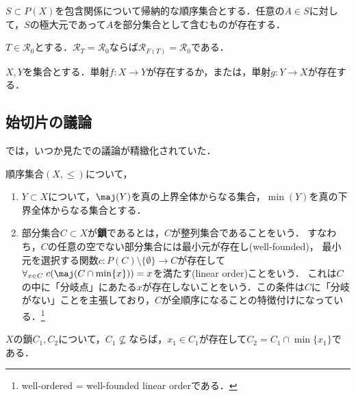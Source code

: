 \documentclass[uplatex,dvipdfmx]{jsreport}
\begin{document}
\begin{theorem}[Zorn, AC (1935)]
    $S\subset P(X)$を包含関係について帰納的な順序集合とする．任意の$A\in S$に対して，$S$の極大元であって$A$を部分集合として含むものが存在する．
\end{theorem}

\begin{lemma}
    $T\in\mathcal{R}_0$とする．$\mathcal{R}_T=\mathcal{R}_0$ならば$\mathcal{R}_{F(T)}=\mathcal{R}_0$である．
\end{lemma}

\begin{proposition}[Setの全順序性 AC]
    $X,Y$を集合とする．単射$f:X\to Y$が存在するか，または，単射$g:Y\to X$が存在する．
\end{proposition}

\subsection{始切片の議論}

\begin{tcolorbox}[colframe=ForestGreen, colback=ForestGreen!10!white,breakable,colbacktitle=ForestGreen!40!white,coltitle=black,fonttitle=\bfseries\sffamily,
title=]
    \cite{Analysis Now}では，いつか見た\cite{松坂和夫}での議論が精緻化されていた．
\end{tcolorbox}

\begin{definition}[chain]
    順序集合$(X,\le)$について，
    \begin{enumerate}
        \item $Y\subset X$について，$\maj(Y)$を真の上界全体からなる集合，$\min(Y)$を真の下界全体からなる集合とする．
        \item 部分集合$C\subset X$が\textbf{鎖}であるとは，$C$が整列集合であることをいう．
        すなわち，$C$の任意の空でない部分集合には最小元が存在し(well-founded)，
        最小元を選択する関数$c:P(C)\setminus\{\emptyset\}\to C$が存在して$\forall_{x\in C}\;c(\maj(C\cap\min\{x\}))=x$を満たす(linear order)ことをいう．
        これは$C$の中に「分岐点」にあたる$x$が存在しないことをいう．この条件は$C$に「分岐がない」ことを主張しており，$C$が全順序になることの特徴付けになっている．\footnote{well-ordered = well-founded linear orderである．}
    \end{enumerate}
\end{definition}

\begin{lemma}
    $X$の鎖$C_1,C_2$について，$C_1\nsubseteq$ならば，$x_1\in C_1$が存在して$C_2=C_1\cap\min\{x_1\}$である．
\end{lemma}
\end{document}
